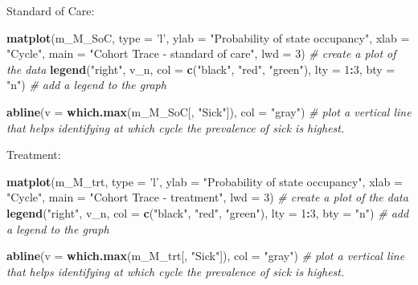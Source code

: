 \documentclass[]{article}
\newenvironment{Shaded}{\begin{snugshade}}{\end{snugshade}}
\newcommand{\KeywordTok}[1]{\textcolor[rgb]{0.13,0.29,0.53}{\textbf{#1}}}
\newcommand{\DataTypeTok}[1]{\textcolor[rgb]{0.13,0.29,0.53}{#1}}
\newcommand{\DecValTok}[1]{\textcolor[rgb]{0.00,0.00,0.81}{#1}}
\newcommand{\StringTok}[1]{\textcolor[rgb]{0.31,0.60,0.02}{#1}}
\newcommand{\CommentTok}[1]{\textcolor[rgb]{0.56,0.35,0.01}{\textit{#1}}}
\newcommand{\OperatorTok}[1]{\textcolor[rgb]{0.81,0.36,0.00}{\textbf{#1}}}
\newcommand{\NormalTok}[1]{#1}
\begin{document}
Standard of Care:

\begin{Shaded}
\begin{Highlighting}[]
\KeywordTok{matplot}\NormalTok{(m_M_SoC, }\DataTypeTok{type =} \StringTok{'l'}\NormalTok{, }
        \DataTypeTok{ylab =} \StringTok{"Probability of state occupancy"}\NormalTok{,}
        \DataTypeTok{xlab =} \StringTok{"Cycle"}\NormalTok{,}
        \DataTypeTok{main =} \StringTok{"Cohort Trace - standard of care"}\NormalTok{, }\DataTypeTok{lwd =} \DecValTok{3}\NormalTok{)  }\CommentTok{# create a plot of the data}
\KeywordTok{legend}\NormalTok{(}\StringTok{"right"}\NormalTok{, v_n, }\DataTypeTok{col =} \KeywordTok{c}\NormalTok{(}\StringTok{"black"}\NormalTok{, }\StringTok{"red"}\NormalTok{, }\StringTok{"green"}\NormalTok{), }
       \DataTypeTok{lty =} \DecValTok{1}\OperatorTok{:}\DecValTok{3}\NormalTok{, }\DataTypeTok{bty =} \StringTok{"n"}\NormalTok{)                            }\CommentTok{# add a legend to the graph}

\KeywordTok{abline}\NormalTok{(}\DataTypeTok{v =} \KeywordTok{which.max}\NormalTok{(m_M_SoC[, }\StringTok{"Sick"}\NormalTok{]), }\DataTypeTok{col =} \StringTok{"gray"}\NormalTok{)      }\CommentTok{# plot a vertical line that helps identifying at which cycle the prevalence of sick is highest.  }
\end{Highlighting}
\end{Shaded}

Treatment:

\begin{Shaded}
\begin{Highlighting}[]
\KeywordTok{matplot}\NormalTok{(m_M_trt, }\DataTypeTok{type =} \StringTok{'l'}\NormalTok{, }
        \DataTypeTok{ylab =} \StringTok{"Probability of state occupancy"}\NormalTok{,}
        \DataTypeTok{xlab =} \StringTok{"Cycle"}\NormalTok{,}
        \DataTypeTok{main =} \StringTok{"Cohort Trace - treatment"}\NormalTok{, }\DataTypeTok{lwd =} \DecValTok{3}\NormalTok{)     }\CommentTok{# create a plot of the data}
\KeywordTok{legend}\NormalTok{(}\StringTok{"right"}\NormalTok{, v_n, }\DataTypeTok{col =} \KeywordTok{c}\NormalTok{(}\StringTok{"black"}\NormalTok{, }\StringTok{"red"}\NormalTok{, }\StringTok{"green"}\NormalTok{), }
       \DataTypeTok{lty =} \DecValTok{1}\OperatorTok{:}\DecValTok{3}\NormalTok{, }\DataTypeTok{bty =} \StringTok{"n"}\NormalTok{)                            }\CommentTok{# add a legend to the graph}

\KeywordTok{abline}\NormalTok{(}\DataTypeTok{v =} \KeywordTok{which.max}\NormalTok{(m_M_trt[, }\StringTok{"Sick"}\NormalTok{]), }\DataTypeTok{col =} \StringTok{"gray"}\NormalTok{)      }\CommentTok{# plot a vertical line that helps identifying at which cycle the prevalence of sick is highest.  }
\end{Highlighting}
\end{Shaded}
\end{document}
